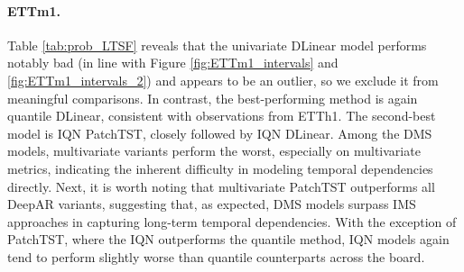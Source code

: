 \documentclass[a4paper,oneside,bibliography=totoc]{scrbook}
\begin{document}
\paragraph{ETTm1.}
Table \ref{tab:prob_LTSF} reveals that the univariate DLinear model performs notably bad (in line with Figure \ref{fig:ETTm1_intervals} and \ref{fig:ETTm1_intervals_2}) and appears to be an outlier, so we exclude it from meaningful comparisons. 
In contrast, the best-performing method is again quantile DLinear, consistent with observations from ETTh1. 
The second-best model is IQN PatchTST, closely followed by IQN DLinear. 
Among the DMS models, multivariate variants perform the worst, especially on multivariate metrics, indicating the inherent difficulty in modeling temporal dependencies directly. 
Next, it is worth noting that multivariate PatchTST outperforms all DeepAR variants, suggesting that, as expected, DMS models surpass IMS approaches in capturing long-term temporal dependencies.
With the exception of PatchTST, where the IQN outperforms the quantile method, IQN models again tend to perform slightly worse than quantile counterparts across the board.
\end{document}

